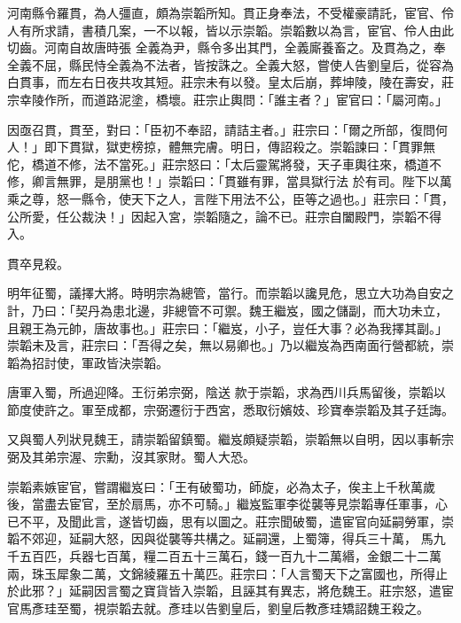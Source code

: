 \begin{pinyinscope}
 河南縣令羅貫，為人彊直，頗為崇韜所知。貫正身奉法，不受權豪請託，宦官、伶人有所求請，書積几案，一不以報，皆以示崇韜。崇韜數以為言，宦官、伶人由此切齒。河南自故唐時張
 全義為尹，縣令多出其門，全義廝養畜之。及貫為之，奉全義不屈，縣民恃全義為不法者，皆按誅之。全義大怒，嘗使人告劉皇后，從容為白貫事，而左右日夜共攻其短。莊宗未有以發。皇太后崩，葬坤陵，陵在壽安，莊宗幸陵作所，而道路泥塗，橋壞。莊宗止輿問：「誰主者？」宦官曰：「屬河南。」



 因亟召貫，貫至，對曰：「臣初不奉詔，請詰主者。」莊宗曰：「爾之所部，復問何人！」即下貫獄，獄吏榜掠，體無完膚。明日，傳詔殺之。崇韜諫曰：「貫罪無佗，橋道不修，法不當死。」莊宗怒曰：「太后靈駕將發，天子車輿往來，橋道不修，卿言無罪，是朋黨也！」崇韜曰：「貫雖有罪，當具獄行法
 於有司。陛下以萬乘之尊，怒一縣令，使天下之人，言陛下用法不公，臣等之過也。」莊宗曰：「貫，公所愛，任公裁決！」因起入宮，崇韜隨之，論不已。莊宗自闔殿門，崇韜不得入。



 貫卒見殺。



 明年征蜀，議擇大將。時明宗為總管，當行。而崇韜以讒見危，思立大功為自安之計，乃曰：「契丹為患北邊，非總管不可禦。魏王繼岌，國之儲副，而大功未立，且親王為元帥，唐故事也。」莊宗曰：「繼岌，小子，豈任大事？必為我擇其副。」崇韜未及言，莊宗曰：「吾得之矣，無以易卿也。」乃以繼岌為西南面行營都統，崇韜為招討使，軍政皆決崇韜。



 唐軍入蜀，所過迎降。王衍弟宗弼，陰送
 款于崇韜，求為西川兵馬留後，崇韜以節度使許之。軍至成都，宗弼遷衍于西宮，悉取衍嬪妓、珍寶奉崇韜及其子廷誨。



 又與蜀人列狀見魏王，請崇韜留鎮蜀。繼岌頗疑崇韜，崇韜無以自明，因以事斬宗弼及其弟宗渥、宗勳，沒其家財。蜀人大恐。



 崇韜素嫉宦官，嘗謂繼岌曰：「王有破蜀功，師旋，必為太子，俟主上千秋萬歲後，當盡去宦官，至於扇馬，亦不可騎。」繼岌監軍李從襲等見崇韜專任軍事，心已不平，及聞此言，遂皆切齒，思有以圖之。莊宗聞破蜀，遣宦官向延嗣勞軍，崇韜不郊迎，延嗣大怒，因與從襲等共構之。延嗣還，上蜀簿，得兵三十萬，
 馬九千五百匹，兵器七百萬，糧二百五十三萬石，錢一百九十二萬緡，金銀二十二萬兩，珠玉犀象二萬，文錦綾羅五十萬匹。莊宗曰：「人言蜀天下之富國也，所得止於此邪？」延嗣因言蜀之寶貨皆入崇韜，且誣其有異志，將危魏王。莊宗怒，遣宦官馬彥珪至蜀，視崇韜去就。彥珪以告劉皇后，劉皇后教彥珪矯詔魏王殺之。




\end{pinyinscope}

